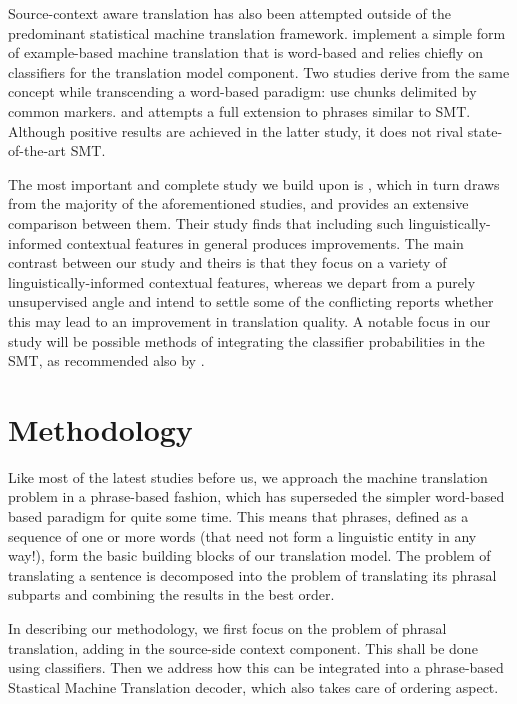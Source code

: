\documentclass[11pt]{article}
\begin{document}
Source-context aware translation has also been attempted outside of the
predominant statistical machine translation framework. \cite{MBMT} implement a
simple form of example-based machine translation that is word-based and relies
chiefly on classifiers for the translation model component. Two studies derive
from the same concept while transcending a word-based paradigm:
\cite{MARKERBASED} use chunks delimited by common markers. and \cite{PBMBMT}
attempts a full extension to phrases similar to SMT. Although positive results
are achieved in the latter study, it does not rival state-of-the-art SMT.

The most important and complete study we build upon is \cite{Rejwanul+11},
which in turn draws from the majority of the aforementioned studies, and
provides an extensive comparison between them. Their study finds that including
such linguistically-informed contextual features in general produces
improvements.  The main contrast between our study and theirs is that they
focus on a variety of linguistically-informed contextual features, whereas we
depart from a purely unsupervised angle and intend to settle some of the
conflicting reports whether this may lead to an improvement in translation
quality. A notable focus in our study will be possible methods of integrating the
classifier probabilities in the SMT, as recommended also by \cite{Gimenez+07}.


\section{Methodology}
\label{ref:methodology}

Like most of the latest studies before us, we approach the machine translation
problem in a phrase-based fashion, which has superseded the simpler word-based
based paradigm for quite some time. This means that phrases, defined as a
sequence of one or more words (that need not form a linguistic entity in any
way!), form the basic building blocks of our translation model. The problem of
translating a sentence is decomposed into the problem of translating its phrasal
subparts and combining the results in the best order.

In describing our methodology, we first focus on the problem of phrasal
translation, adding in the source-side context component. This shall be done
using classifiers. Then we address how this can be integrated into a
phrase-based Stastical Machine Translation decoder, which also takes care of
ordering aspect. 
\end{document}
